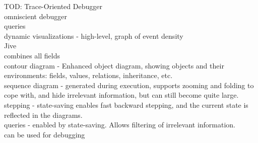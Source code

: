 TOD: Trace-Oriented Debugger\\%
	omniscient debugger\\
	queries\\
	dynamic visualizations - high-level, graph of event density\\

Jive\\%
	combines all fields\\
	contour diagram - Enhanced object diagram, showing objects and their environments: fields, values, relations, inheritance, etc.\\
	sequence diagram - generated during execution, supports zooming and folding to cope with, and hide irrelevant information, but can still become quite large.\\
	stepping - state-saving enables fast backward stepping, and the current state is reflected in the diagrams.\\
	queries - enabled by state-saving. Allows filtering of irrelevant information.\\
	can be used for debugging\\




